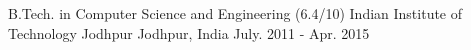 

\begin{cventries}

  \cventry
    {B.Tech. in Computer Science and Engineering (6.4/10)} %
    { Indian Institute of Technology Jodhpur} %
    {Jodhpur, India} %
    {July. 2011 - Apr. 2015} %
    {
      \begin{cvitems} %
      \end{cvitems}
    }

\end{cventries}
